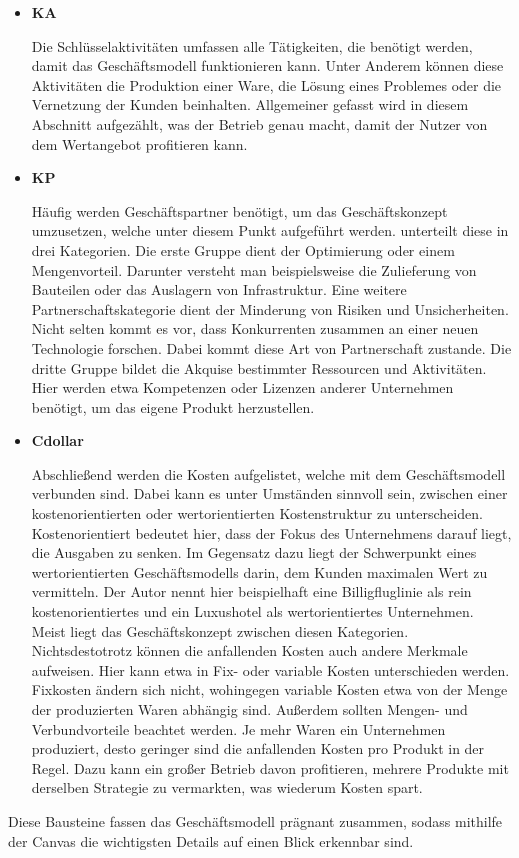 \begin{itemize}
	\item \textbf{\ac{KA}}
	
	Die Schlüsselaktivitäten umfassen alle Tätigkeiten, die benötigt werden, damit das Geschäftsmodell funktionieren kann. Unter Anderem können diese Aktivitäten die Produktion einer Ware, die Lösung eines Problemes oder die Vernetzung der Kunden beinhalten. Allgemeiner gefasst wird in diesem Abschnitt aufgezählt, was der Betrieb genau macht, damit der Nutzer von dem Wertangebot profitieren kann.
	
	\item \textbf{\ac{KP}}
	
	Häufig werden Geschäftspartner benötigt, um das Geschäftskonzept umzusetzen, welche unter diesem Punkt aufgeführt werden. \citeauthor{BusinessModelGeneration} unterteilt diese in drei Kategorien. Die erste Gruppe dient der Optimierung oder einem Mengenvorteil. Darunter versteht man beispielsweise die Zulieferung von Bauteilen oder das Auslagern von Infrastruktur. Eine weitere Partnerschaftskategorie dient der Minderung von Risiken und Unsicherheiten. Nicht selten kommt es vor, dass Konkurrenten zusammen an einer neuen Technologie forschen. Dabei kommt diese Art von Partnerschaft zustande. Die dritte Gruppe bildet die Akquise bestimmter Ressourcen und Aktivitäten. Hier werden etwa Kompetenzen oder Lizenzen anderer Unternehmen benötigt, um das eigene Produkt herzustellen.
	
	\item \textbf{\ac{Cdollar}}
	
	Abschließend werden die Kosten aufgelistet, welche mit dem Geschäftsmodell verbunden sind. Dabei kann es unter Umständen sinnvoll sein, zwischen einer kostenorientierten oder wertorientierten Kostenstruktur zu unterscheiden. Kostenorientiert bedeutet hier, dass der Fokus des Unternehmens darauf liegt, die Ausgaben zu senken. Im Gegensatz dazu liegt der Schwerpunkt eines wertorientierten Geschäftsmodells darin, dem Kunden maximalen Wert zu vermitteln. Der Autor nennt hier beispielhaft eine Billigfluglinie als rein kostenorientiertes und ein Luxushotel als wertorientiertes Unternehmen. Meist liegt das Geschäftskonzept zwischen diesen Kategorien. Nichtsdestotrotz können die anfallenden Kosten auch andere Merkmale aufweisen. Hier kann etwa in Fix- oder variable Kosten unterschieden werden. Fixkosten ändern sich nicht, wohingegen variable Kosten etwa von der Menge der produzierten Waren abhängig sind. Außerdem sollten Mengen- und Verbundvorteile beachtet werden. Je mehr Waren ein Unternehmen produziert, desto geringer sind die anfallenden Kosten pro Produkt in der Regel. Dazu kann ein großer Betrieb davon profitieren, mehrere Produkte mit derselben Strategie zu vermarkten, was wiederum Kosten spart.
	
\end{itemize}

Diese Bausteine fassen das Geschäftsmodell prägnant zusammen, sodass mithilfe der Canvas die wichtigsten Details auf einen Blick erkennbar sind.
\cite{BusinessModelGeneration}